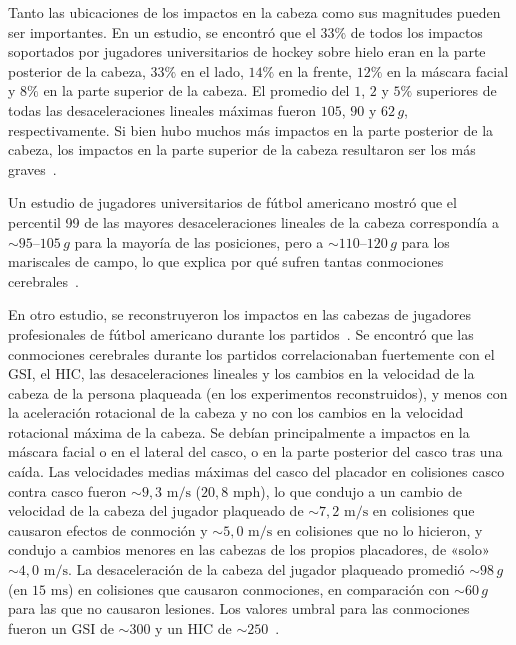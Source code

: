 \documentclass[12pt]{book}
\begin{document}
Tanto las ubicaciones de los impactos en la cabeza como sus magnitudes pueden ser importantes. En un estudio, se encontró que el $33\%$ de todos los impactos soportados por jugadores universitarios de hockey sobre hielo eran en la parte posterior de la cabeza, $33\%$ en el lado, $14\%$ en la frente, $12\%$ en la máscara facial y $8\%$ en la parte superior de la cabeza. El promedio del $1$, $2$ y $5\%$ superiores de todas las desaceleraciones lineales máximas fueron $105$, $90$ y $62\,g$, respectivamente. Si bien hubo muchos más impactos en la parte posterior de la cabeza, los impactos en la parte superior de la cabeza resultaron ser los más graves~\cite{ref63}.


Un estudio de jugadores universitarios de fútbol americano mostró que el percentil 99 de las mayores desaceleraciones lineales de la cabeza correspondía a $\sim 95$--$105\,g$ para la mayoría de las posiciones, pero a $\sim 110$--$120\,g$ para los mariscales de campo, lo que explica por qué sufren tantas conmociones cerebrales~\cite{ref124}.

En otro estudio, se reconstruyeron los impactos en las cabezas de jugadores profesionales de fútbol americano durante los partidos~\cite{ref115}. Se encontró que las conmociones cerebrales durante los partidos correlacionaban fuertemente con el GSI, el HIC, las desaceleraciones lineales y los cambios en la velocidad de la cabeza de la persona plaqueada (en los experimentos reconstruidos), y menos con la aceleración rotacional de la cabeza y no con los cambios en la velocidad rotacional máxima de la cabeza. Se debían principalmente a impactos en la máscara facial o en el lateral del casco, o en la parte posterior del casco tras una caída. Las velocidades medias máximas del casco del placador en colisiones casco contra casco fueron $\sim 9{,}3\text{ m/s}$ ($20{,}8\text{ mph}$), lo que condujo a un cambio de velocidad de la cabeza del jugador plaqueado de $\sim 7{,}2\text{ m/s}$ en colisiones que causaron efectos de conmoción y $\sim 5{,}0\text{ m/s}$ en colisiones que no lo hicieron, y condujo a cambios menores en las cabezas de los propios placadores, de «solo» $\sim 4{,}0\text{ m/s}$. La desaceleración de la cabeza del jugador plaqueado promedió $\sim 98\,g$ (en $15\text{ ms}$) en colisiones que causaron conmociones, en comparación con $\sim 60\,g$ para las que no causaron lesiones. Los valores umbral para las conmociones fueron un GSI de $\sim 300$ y un HIC de $\sim 250$~\cite{ref115}.
\end{document}

